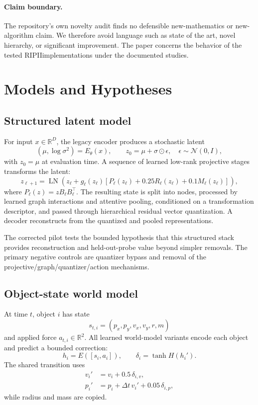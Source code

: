 \documentclass[10pt]{article}
\newcommand{\RIPII}{\textsc{RIPII}}
\begin{document}
\paragraph{Claim boundary.}
The repository's own novelty audit finds no defensible new-mathematics or new-algorithm claim. We therefore avoid language such as state of the art, novel hierarchy, or significant improvement. The paper concerns the behavior of the tested \RIPII implementations under the documented studies.

\section{Models and Hypotheses}

\subsection{Structured latent model}

For input $x\in\mathbb{R}^{D}$, the legacy encoder produces a stochastic latent
\begin{equation}
(\mu,\log \sigma^2)=E_\theta(x), \qquad
z_0=\mu+\sigma\odot\epsilon,\quad \epsilon\sim\mathcal{N}(0,I),
\end{equation}
with $z_0=\mu$ at evaluation time. A sequence of learned low-rank projective stages transforms the latent:
\begin{equation}
z_{\ell+1} =
\operatorname{LN}\left(
z_\ell + g_\ell(z_\ell)
\left[
P_\ell(z_\ell)+0.25R_\ell(z_\ell)+0.1M_\ell(z_\ell)
\right]
\right),
\end{equation}
where $P_\ell(z)=zB_\ell B_\ell^\top$. The resulting state is split into nodes, processed by learned graph interactions and attentive pooling, conditioned on a transformation descriptor, and passed through hierarchical residual vector quantization. A decoder reconstructs from the quantized and pooled representations.

The corrected pilot tests the bounded hypothesis that this structured stack provides reconstruction and held-out-probe value beyond simpler removals. The primary negative controls are quantizer bypass and removal of the projective/graph/quantizer/action mechanisms.

\subsection{Object-state world model}

At time $t$, object $i$ has state
\begin{equation}
s_{t,i}=(p_x,p_y,v_x,v_y,r,m)
\end{equation}
and applied force $a_{t,i}\in\mathbb{R}^{2}$. All learned world-model variants encode each object and predict a bounded correction:
\begin{equation}
h_i=E([s_i,a_i]),\qquad
\delta_i=\tanh H(h_i').
\end{equation}
The shared transition uses
\begin{align}
v_i' &= v_i + 0.5\,\delta_{i,v},\\
p_i' &= p_i + \Delta t\,v_i' + 0.05\,\delta_{i,p},
\end{align}
while radius and mass are copied.
\end{document}
